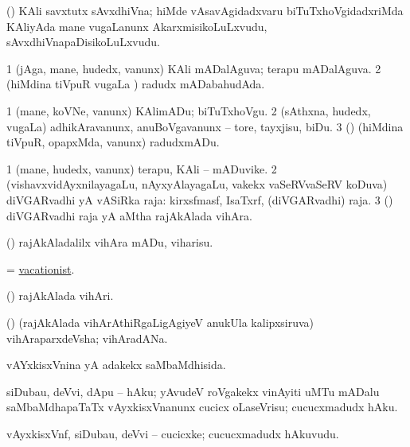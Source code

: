 \bentry
{} 
\gl{\nA}
\expl{}
\bmng
 (\birx) KAli savxtutx sAvxdhiVna; hiMde vAsavAgidadxvaru biTuTxhoVgidadxriMda KAliyAda mane \mo vugaLanunx AkarxmisikoLuLxvudu, sAvxdhiVnapaDisikoLuLxvudu. 
\emng
\eentry

\bentry
{} 
\gl{\gu}
\expl{}
\bmng
\bnum
\num{1} (jAga, mane, hudedx, \mo vanunx) KAli mADalAguva; terapu mADalAguva. 
\num{2} (hiMdina tiVpuR \mo vugaLa \vi) radudx mADabahudAda. 
\enum
\emng
\eentry

\bentry
{} 
\gl{\sakirx}
\expl{}
\bmng
\bnum
\num{1} (mane, koVNe, \mo vanunx) KAlimADu; biTuTxhoVgu. 
\num{2} (sAthxna, hudedx, \mo vugaLa) adhikAravanunx, anuBoVgavanunx -- tore, tayxjisu, biDu. 
\num{3} (\nAyxshA) (hiMdina tiVpuR, opapxMda, \mo vanunx) radudxmADu. 
\enum
\emng
\eentry

\bentry
{} 
\gl{\nA}
\expl{}
\bmng
\bnum
\num{1} (mane, hudedx, \mo vanunx) terapu, KAli -- mADuvike. 
\num{2} (vishavxvidAyxnilayagaLu, nAyxyAlayagaLu, \mo vakekx vaSeRVvaSeRV koDuva) diVGARvadhi yA vASiRka raja: kirxsfmasf, IsaTxrf, \mo (diVGARvadhi) raja. 
\num{3} (\ame) diVGARvadhi raja yA aMtha rajAkAlada vihAra. 
\enum
\emng
\eentry
 
\bentry
{} 
\gl{\akirx}
\expl{}
\bmng
 (\ame) rajAkAladalilx vihAra mADu, viharisu. 
\emng
\eentry

\bentry
{} 
\gl{\nA}
\expl{}
\bmng
= \hyperlink{vacationist}{vacationist}. 
\emng
\eentry

\bentry
{} 
\gl{\nA}
\expl{}
\bmng
 (\ame) rajAkAlada vihAri. 
\emng
\eentry

\bentry
{}
\gl{\nA}
\expl{}
\bmng
 (\ame) (rajAkAlada vihArAthiRgaLigAgiyeV anukUla kalipxsiruva) vihAraparxdeVsha; vihAradANa. 
\emng
\eentry

\bentry
{} 
\gl{\gu}
\expl{}
\bmng
 vAYxkisxVnina yA adakekx saMbaMdhisida. 
\emng
\eentry

\bentry
{} 
\gl{\sakirx}
\expl{}
\bmng
 siDubau, deVvi, dApu -- hAku; yAvudeV roVgakekx vinAyiti uMTu mADalu saMbaMdhapaTaTx vAyxkisxVnanunx cucicx oLaseVrisu; cucucxmadudx hAku. 
\emng
\eentry

\bentry
{} 
\gl{\nA}
\expl{}
\bmng
 vAyxkisxVnf, siDubau, deVvi -- cucicxke; cucucxmadudx hAkuvudu. 
\emng
\eentry

